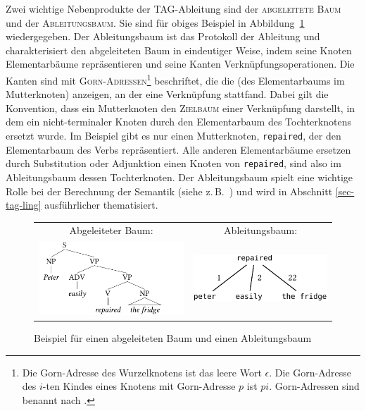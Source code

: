 Zwei wichtige Nebenprodukte der TAG-Ableitung sind der \textsc{abgeleitete Baum} und der \textsc{Ableitungsbaum}. Sie sind für obiges Beispiel in Abbildung~\ref{fig-TAG-bsp2} wiedergegeben. Der Ableitungsbaum ist das Protokoll der Ableitung und charakterisiert den abgeleiteten Baum in eindeutiger Weise, indem seine Knoten Elementarbäume repräsentieren und seine Kanten Verknüpfungsoperationen. Die Kanten sind mit \textsc{Gorn-Adressen}\footnote{Die Gorn-Adresse des Wurzelknotens ist das leere Wort $\epsilon$. Die Gorn-Adresse des $i$-ten Kindes eines Knotens mit Gorn-Adresse $p$ ist $pi$. Gorn-Adressen sind benannt nach \cite{Gorn:67}.}  beschriftet, die die  (des Elementarbaums im Mutterknoten) anzeigen, an der eine Verknüpfung stattfand. Dabei gilt die Konvention, dass ein Mutterknoten den \textsc{Zielbaum} einer Verknüpfung darstellt, in dem ein nicht-terminaler Knoten durch den Elementarbaum des Tochterknotens ersetzt wurde. Im Beispiel gibt es nur einen Mutterknoten, {\tt repaired}, der den Elementarbaum des Verbs repräsentiert. Alle anderen Elementarbäume ersetzen durch Substitution oder Adjunktion einen Knoten von {\tt repaired}, sind also im Ableitungsbaum dessen Tochterknoten. Der Ableitungsbaum spielt eine wichtige Rolle bei der Berechnung der Semantik (siehe z.\,B.\ \citealt{Kallmeyer:Joshi:03,Kallmeyer:Romero:08}) und wird in Abschnitt \ref{sec-tag-ling} ausführlicher thematisiert. \\

\begin{figure}[t]
\centering
\begin{tabular}{cc}
Abgeleiteter Baum:\hspace*{3em} & Ableitungsbaum:\hspace*{4em} \\[2ex]
\begin{minipage}{17em}
\hspace{-1.5em}
\includegraphics{graphics/abb52a.pdf}
\end{minipage}
&
\hspace{-2em}
\includegraphics{graphics/abb52b.pdf}
\end{tabular}
\caption{\label{fig-TAG-bsp2}Beispiel für einen abgeleiteten Baum und einen Ableitungsbaum}
\end{figure}

